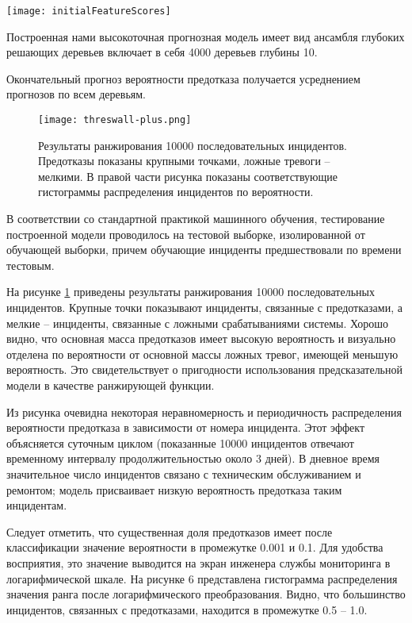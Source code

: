 \begin{figure*}
\centering
\texttt{[image: initialFeatureScores]}
\caption{Анализ важности признаков: эффективность отдельных признаков}
\centering
\label{fig:initialFeatureScores}
\end{figure*}

Построенная нами высокоточная прогнозная модель имеет вид ансамбля глубоких решающих деревьев \cite{friedman2001greedy}
включает в себя 4000 деревьев глубины 10.

Окончательный прогноз вероятности предотказа получается усреднением прогнозов по всем деревьям.


\begin{figure}[thpb]
\centering
\texttt{[image: threswall-plus.png]}
\caption{Результаты ранжирования 10000 последовательных инцидентов.  Предотказы показаны крупными точками, ложные тревоги -- мелкими. В правой части рисунка показаны соответствующие гистограммы распределения инцидентов по вероятности.}
\centering
\label{fig:histo}
\end{figure}

В соответствии со стандартной практикой машинного обучения, тестирование построенной модели проводилось на тестовой выборке, изолированной от обучающей выборки, причем обучающие инциденты предшествовали по времени тестовым.

На рисунке \ref{fig:histo} приведены результаты ранжирования 10000 последовательных инцидентов. Крупные точки показывают инциденты, связанные с предотказами, а мелкие -- инциденты, связанные с ложными срабатываниями системы. Хорошо видно, что основная масса предотказов имеет высокую вероятность и визуально отделена по вероятности от основной массы ложных тревог, имеющей меньшую вероятность. Это свидетельствует о пригодности использования предсказательной модели в качестве ранжирующей функции.

Из рисунка очевидна некоторая неравномерность и периодичность распределения вероятности предотказа в зависимости от номера инцидента. Этот эффект объясняется суточным циклом (показанные 10000 инцидентов отвечают временному интервалу продолжительностью около 3 дней). В дневное время значительное число инцидентов связано с техническим обслуживанием и ремонтом; модель присваивает низкую вероятность предотказа таким инцидентам.


Следует отметить, что существенная доля предотказов имеет после классификации значение вероятности в промежутке 0.001 и 0.1. Для удобства восприятия, это значение выводится на экран инженера службы мониторинга в логарифмической шкале. На рисунке 6 представлена гистограмма распределения значения ранга после логарифмического преобразования. Видно, что большинство инцидентов, связанных с предотказами, находится в промежутке 0.5 – 1.0.

